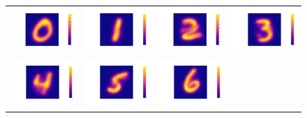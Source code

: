\documentclass{article}
\begin{document}
        \begin{figure}[htb]
            \centering
            \begin{tabular}{@{}cccc@{}}
                \includegraphics[width=.24\textwidth]{images/q7/digit_0.png} &
                \includegraphics[width=.24\textwidth]{images/q7/digit_1.png} &
                \includegraphics[width=.24\textwidth]{images/q7/digit_2.png} &
                \includegraphics[width=.24\textwidth]{images/q7/digit_3.png}   \\
                \includegraphics[width=.24\textwidth]{images/q7/digit_4.png} &
                \includegraphics[width=.24\textwidth]{images/q7/digit_5.png} &
                \includegraphics[width=.24\textwidth]{images/q7/digit_6.png} &

\end{tabular}
\end{figure}
\end{document}
